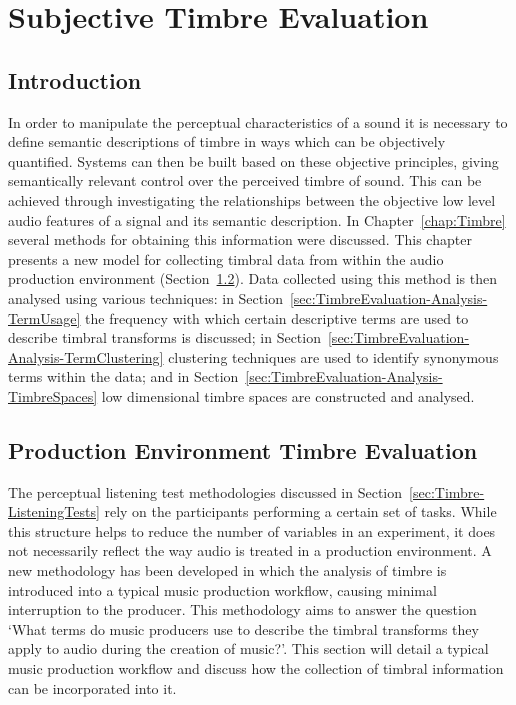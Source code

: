 \chapter{Subjective Timbre Evaluation}
\label{chap:TimbreEvaluation}

\section{Introduction}
\label{sec:TimbreEvaluation-Introduction}
	In order to manipulate the perceptual characteristics of a sound it is necessary to define semantic descriptions of
	timbre in ways which can be objectively quantified. Systems can then be built based on these objective principles,
	giving semantically relevant control over the perceived timbre of sound. This can be achieved through investigating
	the relationships between the objective low level audio features of a signal and its semantic description.  In
	Chapter~\ref{chap:Timbre} several methods for obtaining this information were discussed. This chapter presents a
	new model for collecting timbral data from within the audio production environment
	(Section~\ref{sec:TimbreEvaluation-DAWBasedTimbreEvaluation}). Data collected using this method is then analysed
	using various techniques: in Section~\ref{sec:TimbreEvaluation-Analysis-TermUsage} the frequency with which certain
	descriptive terms are used to describe timbral transforms is discussed; in
	Section~\ref{sec:TimbreEvaluation-Analysis-TermClustering} clustering techniques are used to identify synonymous
	terms within the data; and in Section~\ref{sec:TimbreEvaluation-Analysis-TimbreSpaces} low dimensional timbre
	spaces are constructed and analysed.

\section{Production Environment Timbre Evaluation} %
\label{sec:TimbreEvaluation-DAWBasedTimbreEvaluation}
	The perceptual listening test methodologies discussed in Section~\ref{sec:Timbre-ListeningTests} rely on the
	participants performing a certain set of tasks. While this structure helps to reduce the number of variables in an
	experiment, it does not necessarily reflect the way audio is treated in a production environment. A new methodology
	has been developed in which the analysis of timbre is introduced into a typical music production workflow, causing
	minimal interruption to the producer. This methodology aims to answer the question `What terms do music producers
	use to describe the timbral transforms they apply to audio during the creation of music?'. This section will
	detail a typical music production workflow and discuss how the collection of timbral information can be
	incorporated into it.

